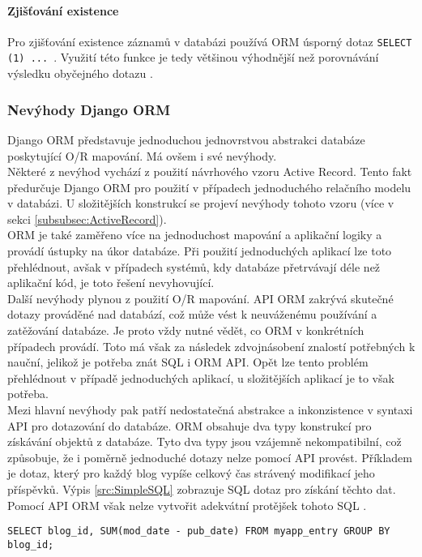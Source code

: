 \documentclass[ing,male,java,dept456]{diploma}						%
\begin{document}
\paragraph{Zjišťování existence} Pro zjišťování existence záznamů v databázi používá ORM úsporný dotaz \lstinline[style=customsql]|SELECT (1) ... |. Využití této funkce je tedy většinou výhodnější než porovnávání výsledku obyčejného dotazu \cite{dj-exists}.

\subsubsection{Nevýhody Django ORM}

Django ORM představuje jednoduchou jednovrstvou abstrakci databáze poskytující O/R mapování. Má ovšem i své nevýhody. \\
Některé z nevýhod vychází z použití návrhového vzoru Active Record. Tento fakt předurčuje Django ORM pro použití v případech jednoduchého relačního modelu v databázi. U složitějších konstrukcí se projeví nevýhody tohoto vzoru (více v sekci \ref{subsubsec:ActiveRecord}). \\
ORM je také zaměřeno více na jednoduchost mapování a aplikační logiky a provádí ústupky na úkor databáze. Při použití jednoduchých aplikací lze toto přehlédnout, avšak v případech systémů, kdy databáze přetrvávají déle než aplikační kód, je toto řešení nevyhovující. \\
Další nevýhody plynou z použití O/R mapování. API ORM zakrývá skutečné dotazy prováděné nad databází, což může vést k neuváženému používání a zatěžování databáze. Je proto vždy nutné vědět, co ORM v konkrétních případech provádí. Toto má však za následek zdvojnásobení znalostí potřebných k nauční, jelikož je potřeba znát SQL i ORM API. Opět lze tento problém přehlédnout v případě jednoduchých aplikací, u složitějších aplikací je to však potřeba. \\
Mezi hlavní nevýhody pak patří nedostatečná abstrakce a inkonzistence v syntaxi API pro dotazování do databáze. ORM obsahuje dva typy konstrukcí pro získávání objektů z databáze. Tyto dva typy jsou vzájemně nekompatibilní, což způsobuje, že i poměrně jednoduché dotazy nelze pomocí API provést. Příkladem je dotaz, který pro každý blog vypíše celkový čas strávený modifikací jeho příspěvků. Výpis \ref{src:SimpleSQL} zobrazuje SQL dotaz pro získání těchto dat. Pomocí API ORM však nelze vytvořit adekvátní protějšek tohoto SQL \cite{dj-dis}.
\begin{lstlisting}[style=customsql, label=src:SimpleSQL, caption={Příklad dotazu, který nelze provést pomocí Django ORM API}]
SELECT blog_id, SUM(mod_date - pub_date) FROM myapp_entry GROUP BY blog_id;
\end{lstlisting}
\end{document}
